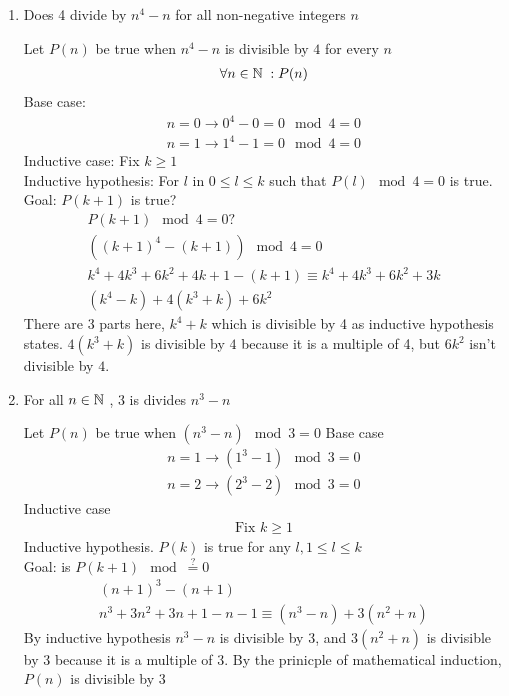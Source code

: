 \documentclass[11pt]{article}
\begin{document}

\begin{enumerate}
    \item Does 4 divide by $n^4-n$ for all non-negative integers $n$
    \begin{customsolutionbox}
        Let $P(n)$ be true when $n^4 -n$ is divisible by $4$ for every $n$
        \begin{gather}
            \forall n \in \mathbb{N}\hspace{1.0mm}: P(n)
        \end{gather}
        Base case:
        \begin{gather}
            n = 0 \rightarrow 0^4-0 = 0 \mod 4 = 0 \\
            n = 1 \rightarrow 1^4 - 1 = 0 \mod 4 = 0
        \end{gather}
        Inductive case: Fix $k \geq 1$ \\
        Inductive hypothesis: For $l$ in $0 \leq l \leq k$ such that $P(l) \mod 4 = 0$ is true. \\
        Goal: $P(k+1)$ is true? \\
        \begin{gather}
            P(k+1) \mod 4 = 0 ? \\
            ((k+1)^4 - (k+1)) \mod 4 = 0 \\
            k^4 + 4k^3 + 6k^2 + 4k + 1 - (k+1) \equiv k^4+4k^3+6k^2 + 3k\\
            (k^4 - k) + 4(k^3 + k)+6k^2
        \end{gather}
        There are 3 parts here, $k^4+k$ which is divisible by 4 as inductive hypothesis states. $4(k^3+k)$ is divisible by $4$ because it is a multiple of 4, but $6k^2$ isn't divisible by $4$.
    \end{customsolutionbox}

    \item For all $n \in \mathbb{N}\hspace{1.0mm}$, 3 is divides $n^3-n$
    \begin{customsolutionbox}
        Let $P(n)$ be true when $(n^3-n) \mod 3 = 0$
        Base case
        \begin{gather}
            n = 1 \rightarrow (1^3 -1) \mod 3 = 0 \\
            n = 2 \rightarrow (2^3 - 2) \mod 3 = 0
        \end{gather}
        Inductive case
        \begin{gather}
            \text{Fix } k \geq 1
        \end{gather}
        Inductive hypothesis. $P(k)$ is true for any $l, 1 \leq l \leq k$ \\
        Goal: is $P(k+1) \mod \stackrel{?}{=} 0$
        \begin{gather}
            (n+1)^3 - (n+1) \\
            n^3 + 3n^2 + 3n + 1 - n - 1 \equiv (n^3 - n) + 3(n^2+n)
        \end{gather}
        By inductive hypothesis $n^3 - n$ is divisible by 3, and $3(n^2+n)$ is divisible by 3 because it is a multiple of $3$. By the prinicple of mathematical induction, $P(n)$ is divisible by $3$
    \end{customsolutionbox}
\end{enumerate}
\end{document}
